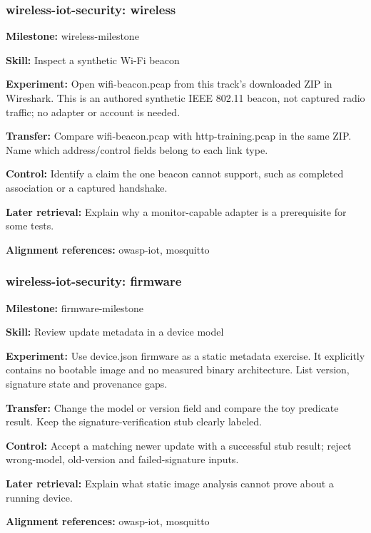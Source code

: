 \subsubsection{wireless-iot-security: wireless}
\noindent\textbf{Milestone:} wireless-milestone\par
\noindent\textbf{Skill:} Inspect a synthetic Wi-Fi beacon\par
\noindent\textbf{Experiment:} Open wifi-beacon.pcap from this track’s downloaded ZIP in Wireshark. This is an authored synthetic IEEE 802.11 beacon, not captured radio traffic; no adapter or account is needed.\par
\noindent\textbf{Transfer:} Compare wifi-beacon.pcap with http-training.pcap in the same ZIP. Name which address/control fields belong to each link type.\par
\noindent\textbf{Control:} Identify a claim the one beacon cannot support, such as completed association or a captured handshake.\par
\noindent\textbf{Later retrieval:} Explain why a monitor-capable adapter is a prerequisite for some tests.\par
\noindent\textbf{Alignment references:} owasp-iot, mosquitto\par
\subsubsection{wireless-iot-security: firmware}
\noindent\textbf{Milestone:} firmware-milestone\par
\noindent\textbf{Skill:} Review update metadata in a device model\par
\noindent\textbf{Experiment:} Use device.json firmware as a static metadata exercise. It explicitly contains no bootable image and no measured binary architecture. List version, signature state and provenance gaps.\par
\noindent\textbf{Transfer:} Change the model or version field and compare the toy predicate result. Keep the signature-verification stub clearly labeled.\par
\noindent\textbf{Control:} Accept a matching newer update with a successful stub result; reject wrong-model, old-version and failed-signature inputs.\par
\noindent\textbf{Later retrieval:} Explain what static image analysis cannot prove about a running device.\par
\noindent\textbf{Alignment references:} owasp-iot, mosquitto\par
